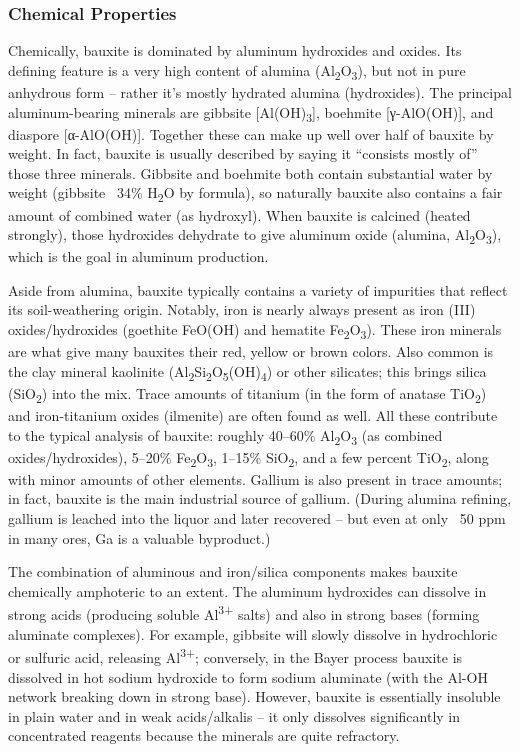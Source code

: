 \documentclass[12pt,a4paper, top=1.9cm, bottom=2.03cm, left=3.81cm, right=1.9cm]{article}
\begin{document}
\subsubsection{Chemical Properties}
\noindent\fontsize{12}{14}\selectfont Chemically, bauxite is dominated by aluminum hydroxides and oxides. Its defining feature is a very high content of alumina (Al\textsubscript{2}O\textsubscript{3}), but not in pure anhydrous form – rather it’s mostly hydrated alumina (hydroxides). The principal aluminum-bearing minerals are gibbsite [Al(OH)\textsubscript{3}], boehmite [γ-AlO(OH)], and diaspore [α-AlO(OH)]. Together these can make up well over half of bauxite by weight. In fact, bauxite is usually described by saying it “consists mostly of” those three minerals. Gibbsite and boehmite both contain substantial water by weight (gibbsite ~34\% H\textsubscript{2}O by formula), so naturally bauxite also contains a fair amount of combined water (as hydroxyl). When bauxite is calcined (heated strongly), those hydroxides dehydrate to give aluminum oxide (alumina, Al\textsubscript{2}O\textsubscript{3}), which is the goal in aluminum production.
 
\noindent\fontsize{12}{14}\selectfont Aside from alumina, bauxite typically contains a variety of impurities that reflect its soil-weathering origin. Notably, iron is nearly always present as iron (III) oxides/hydroxides (goethite FeO(OH) and hematite Fe\textsubscript{2}O\textsubscript{3}). These iron minerals are what give many bauxites their red, yellow or brown colors. Also common is the clay mineral kaolinite (Al\textsubscript{2}Si\textsubscript{2}O\textsubscript{5}(OH)\textsubscript{4}) or other silicates; this brings silica (SiO\textsubscript{2}) into the mix. Trace amounts of titanium (in the form of anatase TiO\textsubscript{2}) and iron-titanium oxides (ilmenite) are often found as well. All these contribute to the typical analysis of bauxite: roughly 40–60\% Al\textsubscript{2}O\textsubscript{3} (as combined oxides/hydroxides), 5–20\% Fe\textsubscript{2}O\textsubscript{3}, 1–15\% SiO\textsubscript{2}, and a few percent TiO\textsubscript{2}, along with minor amounts of other elements. Gallium is also present in trace amounts; in fact, bauxite is the main industrial source of gallium. (During alumina refining, gallium is leached into the liquor and later recovered – but even at only ~50 ppm in many ores, Ga is a valuable byproduct.)
 
\noindent\fontsize{12}{14}\selectfont The combination of aluminous and iron/silica components makes bauxite chemically amphoteric to an extent. The aluminum hydroxides can dissolve in strong acids (producing soluble Al\textsuperscript{3+} salts) and also in strong bases (forming aluminate complexes). For example, gibbsite will slowly dissolve in hydrochloric or sulfuric acid, releasing Al\textsuperscript{3+}; conversely, in the Bayer process bauxite is dissolved in hot sodium hydroxide to form sodium aluminate (with the Al-OH network breaking down in strong base). However, bauxite is essentially insoluble in plain water and in weak acids/alkalis – it only dissolves significantly in concentrated reagents because the minerals are quite refractory.
 
\end{document}
